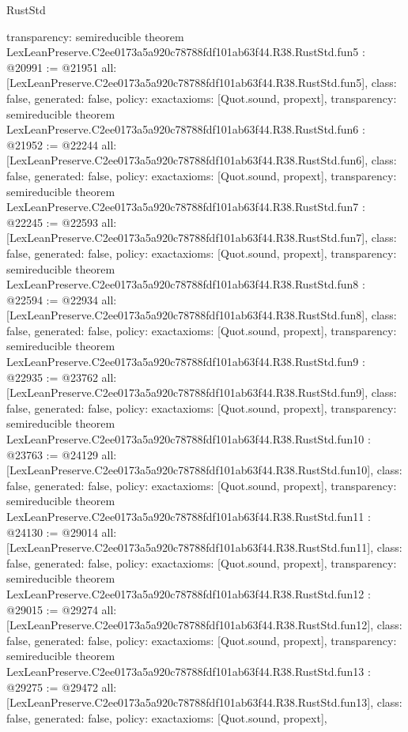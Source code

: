 \begin{lexlean}{RustStd}
\begin{coremodule}
{  transparency: semireducible
}
theorem LexLeanPreserve.C2ee0173a5a920c78788fdf101ab63f44.R38.RustStd.fun5 : @20991 := @21951 {
  all: [LexLeanPreserve.C2ee0173a5a920c78788fdf101ab63f44.R38.RustStd.fun5],
  class: false,
  generated: false,
  policy: exact{axioms: [Quot.sound, propext]},
  transparency: semireducible
}
theorem LexLeanPreserve.C2ee0173a5a920c78788fdf101ab63f44.R38.RustStd.fun6 : @21952 := @22244 {
  all: [LexLeanPreserve.C2ee0173a5a920c78788fdf101ab63f44.R38.RustStd.fun6],
  class: false,
  generated: false,
  policy: exact{axioms: [Quot.sound, propext]},
  transparency: semireducible
}
theorem LexLeanPreserve.C2ee0173a5a920c78788fdf101ab63f44.R38.RustStd.fun7 : @22245 := @22593 {
  all: [LexLeanPreserve.C2ee0173a5a920c78788fdf101ab63f44.R38.RustStd.fun7],
  class: false,
  generated: false,
  policy: exact{axioms: [Quot.sound, propext]},
  transparency: semireducible
}
theorem LexLeanPreserve.C2ee0173a5a920c78788fdf101ab63f44.R38.RustStd.fun8 : @22594 := @22934 {
  all: [LexLeanPreserve.C2ee0173a5a920c78788fdf101ab63f44.R38.RustStd.fun8],
  class: false,
  generated: false,
  policy: exact{axioms: [Quot.sound, propext]},
  transparency: semireducible
}
theorem LexLeanPreserve.C2ee0173a5a920c78788fdf101ab63f44.R38.RustStd.fun9 : @22935 := @23762 {
  all: [LexLeanPreserve.C2ee0173a5a920c78788fdf101ab63f44.R38.RustStd.fun9],
  class: false,
  generated: false,
  policy: exact{axioms: [Quot.sound, propext]},
  transparency: semireducible
}
theorem LexLeanPreserve.C2ee0173a5a920c78788fdf101ab63f44.R38.RustStd.fun10 : @23763 := @24129 {
  all: [LexLeanPreserve.C2ee0173a5a920c78788fdf101ab63f44.R38.RustStd.fun10],
  class: false,
  generated: false,
  policy: exact{axioms: [Quot.sound, propext]},
  transparency: semireducible
}
theorem LexLeanPreserve.C2ee0173a5a920c78788fdf101ab63f44.R38.RustStd.fun11 : @24130 := @29014 {
  all: [LexLeanPreserve.C2ee0173a5a920c78788fdf101ab63f44.R38.RustStd.fun11],
  class: false,
  generated: false,
  policy: exact{axioms: [Quot.sound, propext]},
  transparency: semireducible
}
theorem LexLeanPreserve.C2ee0173a5a920c78788fdf101ab63f44.R38.RustStd.fun12 : @29015 := @29274 {
  all: [LexLeanPreserve.C2ee0173a5a920c78788fdf101ab63f44.R38.RustStd.fun12],
  class: false,
  generated: false,
  policy: exact{axioms: [Quot.sound, propext]},
  transparency: semireducible
}
theorem LexLeanPreserve.C2ee0173a5a920c78788fdf101ab63f44.R38.RustStd.fun13 : @29275 := @29472 {
  all: [LexLeanPreserve.C2ee0173a5a920c78788fdf101ab63f44.R38.RustStd.fun13],
  class: false,
  generated: false,
  policy: exact{axioms: [Quot.sound, propext]},
}
\end{coremodule}
\end{lexlean}

